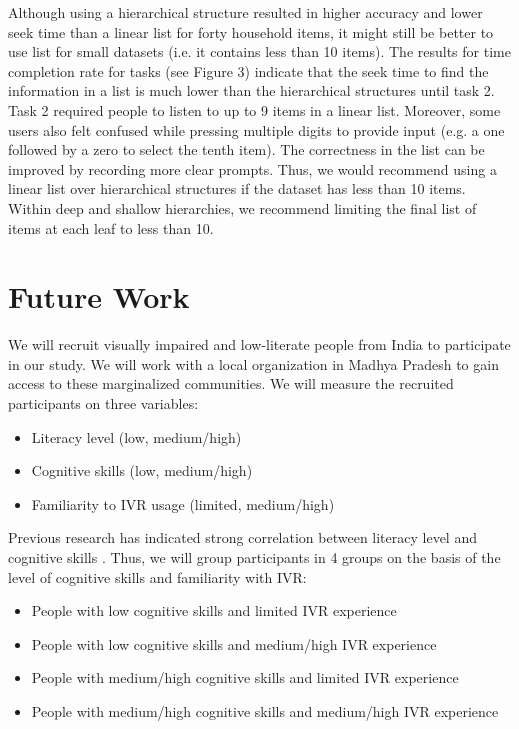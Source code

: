 \documentclass{sigchi}
\begin{document}
Although using a hierarchical structure resulted in higher accuracy and lower seek time than a linear list for forty household items, it might still be better to use list for small datasets (i.e. it contains less than 10 items). The results for time completion rate for tasks (see Figure 3) indicate that the seek time to find the information in a list is much lower than the hierarchical structures until task 2. Task 2 required people to listen to up to 9 items in a linear list.  Moreover, some users also felt confused while pressing multiple digits to provide input (e.g. a one followed by a zero to select the tenth item). The correctness in the list can be improved by recording more clear prompts. Thus, we would recommend using a linear list over hierarchical structures if the dataset has less than 10 items. Within deep and shallow hierarchies, we recommend limiting the final list of items at each leaf to less than 10.


\section{Future Work}
We will recruit visually impaired and low-literate people from India to participate in our study. We will work with a local organization in Madhya Pradesh to gain access to these marginalized communities. We will measure the recruited participants on three variables:
\begin{itemize}
\item Literacy level (low, medium/high)
\item Cognitive skills (low, medium/high)
\item Familiarity to IVR usage (limited, medium/high)
\end{itemize}

Previous research has indicated strong correlation between literacy level and cognitive skills \cite{Reis2001,Medhi2013a}. Thus, we will group participants in 4 groups on the basis of the level of cognitive skills and familiarity with IVR:

\begin{itemize}
\item People with low cognitive skills and limited IVR experience
\item People with low cognitive skills and medium/high IVR experience
\item People with medium/high cognitive skills and limited IVR experience
\item People with medium/high cognitive skills and medium/high IVR experience
\end{itemize}
\end{document}
